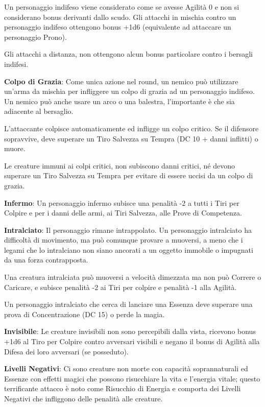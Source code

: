 \documentclass[a4paper,11pt,twoside,openany]{book}
\begin{document}
Un personaggio indifeso viene considerato come se avesse Agilità 0 e non si considerano bonus derivanti dallo scudo. Gli attacchi in mischia contro un personaggio indifeso ottengono bonus +1d6 (equivalente ad attaccare un personaggio Prono).

Gli attacchi a distanza, non ottengono alcun bonus particolare contro i bersagli indifesi.

\textbf{Colpo di Grazia}: Come unica azione nel round, un nemico può utilizzare un'arma da mischia per infliggere un colpo di grazia ad un personaggio indifeso. Un nemico può anche usare un arco o una balestra, l'importante è che sia adiacente al bersaglio.

L'attaccante colpisce automaticamente ed infligge un colpo critico. Se il difensore sopravvive, deve superare un Tiro Salvezza su Tempra (DC 10 + danni inflitti) o muore.

Le creature immuni ai colpi critici, non subiscono danni critici, né devono superare un Tiro Salvezza su Tempra per evitare di essere uccisi da un colpo di grazia.

\textbf{Infermo}: Un personaggio infermo subisce una penalità -2 a tutti i Tiri per Colpire e per i danni delle armi, ai Tiri Salvezza, alle Prove di Competenza.

\textbf{Intralciato}: Il personaggio rimane intrappolato. Un personaggio intralciato ha difficoltà di movimento, ma può comunque provare a muoversi, a meno che i legami che lo intralciano non siano ancorati a un oggetto immobile o impugnati da una forza contrapposta.

Una creatura intralciata può muoversi a velocità dimezzata ma non può Correre o Caricare, e subisce penalità -2 ai Tiri per colpire e penalità -1 alla Agilità.

Un personaggio intralciato che cerca di lanciare una Essenza deve superare una prova di Concentrazione (DC 15) o perde la magia.

\textbf{Invisibile}: Le creature invisibili non sono percepibili dalla vista, ricevono bonus +1d6 al Tiro per Colpire contro avversari visibili e negano il bonus di Agilità alla Difesa dei loro avversari (se posseduto).

\textbf{Livelli Negativi}: Ci sono creature non morte con capacità soprannaturali ed Essenze con effetti magici che possono risucchiare la vita e l'energia vitale; questo terrificante attacco è noto come Risucchio di Energia e comporta dei Livelli Negativi che infliggono delle penalità alle creature.
\end{document}
